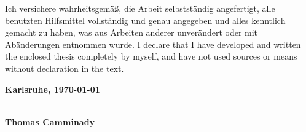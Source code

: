 \vspace*{36\baselineskip}
\par
{}
  {Ich versichere wahrheitsgem\"a\ss, die Arbeit selbstst\"andig angefertigt, alle benutzten Hilfsmittel vollst\"andig und genau angegeben und alles kenntlich gemacht zu haben, was aus Arbeiten anderer unver\"andert oder mit Ab\"anderungen entnommen wurde.}
  {I declare that I have developed and written the enclosed thesis completely by myself, and have not used sources or means without declaration in the text.}

\textbf{Karlsruhe, \today}
\vspace{1.5cm}

\dotfill\hspace*{8.0cm}\\
\textbf{Thomas Camminady} %

\thispagestyle{empty}
